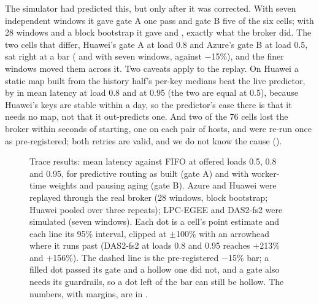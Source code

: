 The simulator had predicted this, but only after it was corrected. With seven independent windows it gave gate A one pass and gate B five of the six cells; with 28 windows and a block bootstrap it gave \SimBlockAPassed{} and \SimBlockBPassed{}, exactly what the broker did. The two cells that differ, Huawei's gate A at load 0.8 and Azure's gate B at load 0.5, sat right at a bar (\HuaweiAEight{} and \AzureBHalf{} with seven windows, against $-$15\%), and the finer windows moved them across it. Two caveats apply to the replay. On Huawei a static map built from the history half's per-key medians beat the live predictor, by \ReplayHuaweiVsStaticEightAbs{} in mean latency at load 0.8 and \ReplayHuaweiVsStaticNinetyFiveAbs{} at 0.95 (the two are equal at 0.5), because Huawei's keys are stable within a day, so the predictor's case there is that it needs no map, not that it out-predicts one. And two of the 76 cells lost the broker within seconds of starting, one on each pair of hosts, and were re-run once as pre-registered; both retries are valid, and we do not know the cause ().

\begin{figure}[t]
  \centering
  
  \caption{Trace results: mean latency against FIFO at offered loads 0.5, 0.8 and 0.95, for predictive routing as built (gate A) and with worker-time weights and pausing aging (gate B). Azure and Huawei were replayed through the real broker (28 windows, block bootstrap; Huawei pooled over three repeats); LPC-EGEE and DAS2-fs2 were simulated (seven windows). Each dot is a cell's point estimate and each line its 95\% interval, clipped at $\pm$100\% with an arrowhead where it runs past (DAS2-fs2 at loads 0.8 and 0.95 reaches $+$213\% and $+$156\%). The dashed line is the pre-registered $-$15\% bar; a filled dot passed its gate and a hollow one did not, and a gate also needs its guardrails, so a dot left of the bar can still be hollow. The numbers, with margins, are in .}\label{fig:traces}
\end{figure}

